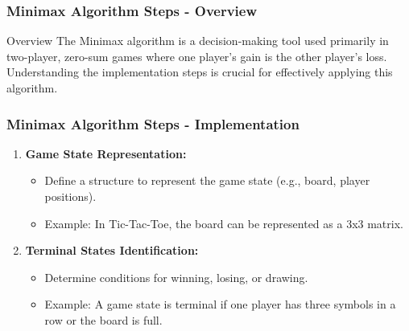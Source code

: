 \documentclass[aspectratio=169]{beamer}
\begin{document}
\begin{frame}[fragile]
    \frametitle{Minimax Algorithm Steps - Overview}
    \begin{block}{Overview}
        The Minimax algorithm is a decision-making tool used primarily in two-player, zero-sum games where one player's gain is the other player's loss. Understanding the implementation steps is crucial for effectively applying this algorithm.
    \end{block}
\end{frame}

\begin{frame}[fragile]
    \frametitle{Minimax Algorithm Steps - Implementation}
    \begin{enumerate}
        \item \textbf{Game State Representation:}
        \begin{itemize}
            \item Define a structure to represent the game state (e.g., board, player positions).
            \item Example: In Tic-Tac-Toe, the board can be represented as a 3x3 matrix.
        \end{itemize}
        
        \item \textbf{Terminal States Identification:}
        \begin{itemize}
            \item Determine conditions for winning, losing, or drawing.
            \item Example: A game state is terminal if one player has three symbols in a row or the board is full.
        \end{itemize}
    \end{enumerate}
\end{frame}
\end{document}
